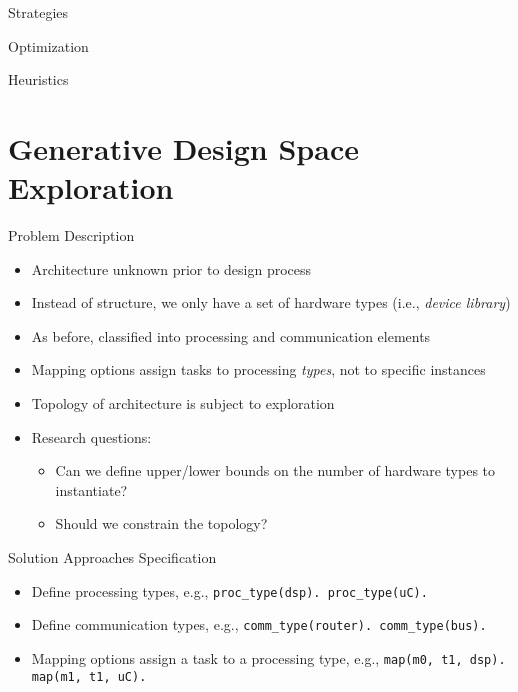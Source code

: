 \documentclass[11pt]{beamer}
\begin{document}
\begin{frame}{Strategies}
\end{frame}

\begin{frame}{Optimization}
\end{frame}

\begin{frame}{Heuristics}
\end{frame}

\section{Generative Design Space Exploration}

\begin{frame}{Problem Description}
  \begin{itemize}
    \item Architecture unknown prior to design process
    \item Instead of structure, we only have a set of hardware types (i.e., \textit{device library})
    \item As before, classified into processing and communication elements
    \item Mapping options assign tasks to processing \textit{types}, not to specific instances
    \item Topology of architecture is subject to exploration 
    \item Research questions:
    \begin{itemize}
      \item Can we define upper/lower bounds on the number of hardware types to instantiate?
      \item Should we constrain the topology? 
    \end{itemize}
  \end{itemize}
\end{frame}

\begin{frame}{Solution Approaches }
  Specification
  \begin{itemize} 
     \item Define processing types, e.g., \texttt{proc\_type(dsp). proc\_type(uC).}
     \item Define communication types, e.g., \texttt{comm\_type(router). comm\_type(bus).}
     \item Mapping options assign a task to a processing type, e.g., \texttt{map(m0, t1, dsp). map(m1, t1, uC).}
  \end{itemize}
\end{frame}
\end{document}
